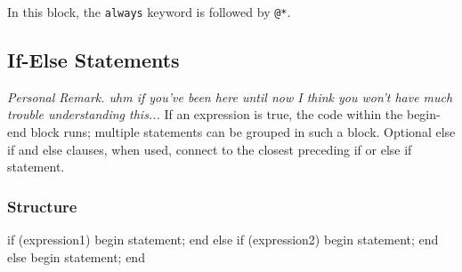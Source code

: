 \documentclass[12pt,openany, tikz,border=10pt]{book}
\begin{document}
In this block, the \texttt{always} keyword is followed by \texttt{@*}.

\subsection{If-Else Statements}
\textit{Personal Remark. uhm if you've been here until now I think you won't have much trouble understanding this...} \newline
If an expression is true, the code within the begin-end block runs; multiple statements can be grouped in such a block. Optional else if and else clauses, when used, connect to the closest preceding if or else if statement.
\noindent
\subsubsection{Structure}
\begin{vhdl}
if (expression1)
begin
	statement;
end
else if (expression2)
begin
	statement;
end
else
begin
	statement;
end
\end{vhdl}
\end{document}
